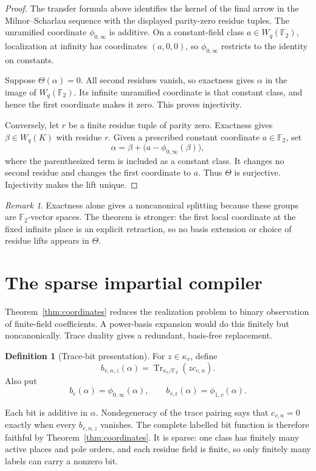 \documentclass[11pt]{article}
\theoremstyle{definition}
\newtheorem{definition}[theorem]{Definition}
\theoremstyle{remark}
\newtheorem{remark}[theorem]{Remark}
\newcommand{\F}{\mathbb{F}}
\newcommand{\Tr}{\operatorname{Tr}}
\begin{document}
\begin{proof}
The transfer formula above identifies the kernel of the final arrow in the
Milnor--Scharlau sequence with the displayed parity-zero residue tuples.
The unramified coordinate $\phi_{0,\infty}$ is additive.  On a constant-field
class $a\in W_q(\F_2)$, localization at infinity has coordinates $(a,0,0)$,
so $\phi_{0,\infty}$ restricts to the identity on constants.

Suppose $\Theta(\alpha)=0$.  All second residues vanish, so exactness gives
$\alpha$ in the image of $W_q(\F_2)$.  Its infinite unramified coordinate is
that constant class, and hence the first coordinate makes it zero.  This proves
injectivity.

Conversely, let $r$ be a finite residue tuple of parity zero.  Exactness gives
$\beta\in W_q(K)$ with residue $r$.  Given a prescribed constant coordinate
$a\in\F_2$, set
\[
\alpha=\beta+\bigl(a-\phi_{0,\infty}(\beta)\bigr),
\]
where the parenthesized term is included as a constant class.  It changes no
second residue and changes the first coordinate to $a$.  Thus $\Theta$ is
surjective.  Injectivity makes the lift unique.
\end{proof}

\begin{remark}
Exactness alone gives a noncanonical splitting because these groups are
$\F_2$-vector spaces.  The theorem is stronger: the first local coordinate at
the fixed infinite place is an explicit retraction, so no basis extension or
choice of residue lifts appears in $\Theta$.
\end{remark}

\section{The sparse impartial compiler}

Theorem~\ref{thm:coordinates} reduces the realization problem to binary
observation of finite-field coefficients.  A power-basis expansion would do
this finitely but noncanonically.  Trace duality gives a redundant,
basis-free replacement.

\begin{definition}[Trace-bit presentation]
For $z\in\kappa_v$, define
\[
b_{v,n,z}(\alpha)=
\Tr_{\kappa_v/\F_2}(z c_{v,n}).
\]
Also put
\[
b_{\mathrm c}(\alpha)=\phi_{0,\infty}(\alpha),
\qquad
b_{v,\mathrm r}(\alpha)=\phi_{1,v}(\alpha).
\]
\end{definition}

Each bit is additive in $\alpha$.  Nondegeneracy of the trace pairing says
that $c_{v,n}=0$ exactly when every $b_{v,n,z}$ vanishes.  The complete
labelled bit function is therefore faithful by
Theorem~\ref{thm:coordinates}.  It is sparse: one class has finitely many
active places and pole orders, and each residue field is finite, so only
finitely many labels can carry a nonzero bit.
\end{document}
